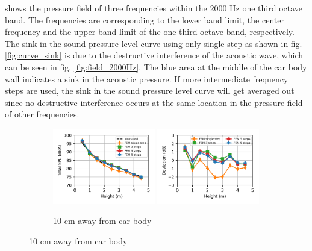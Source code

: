 \noindent{} shows the pressure field of three frequencies within the 2000 Hz one third octave band. The frequencies are corresponding to the lower band limit, the center frequency and the upper band limit of the one third octave band, respectively. The sink in the sound pressure level curve using only single step as shown in fig. \ref{fig:curve_sink} is due to the destructive interference of the acoustic wave, which can be seen in fig. \ref{fig:field_2000Hz}. The blue area at the middle of the car body wall indicates a sink in the acoustic pressure. If more intermediate frequency steps are used, the sink in the sound pressure level curve will get averaged out since no destructive interference occurs at the same location in the pressure field of other frequencies.

\begin{figure}[H]
	\begin{subfigure}[b]{\textwidth}
		\centering
		\includegraphics[width=0.49\textwidth]{fig/chap5/freq_steps/overall_SPL/pos_a.png}
		\includegraphics[width=0.49\textwidth]{fig/chap5/freq_steps/overall_SPL/pos_a_deviation.png}
		\caption{10 cm away from car body}
	\end{subfigure}
\end{figure}
